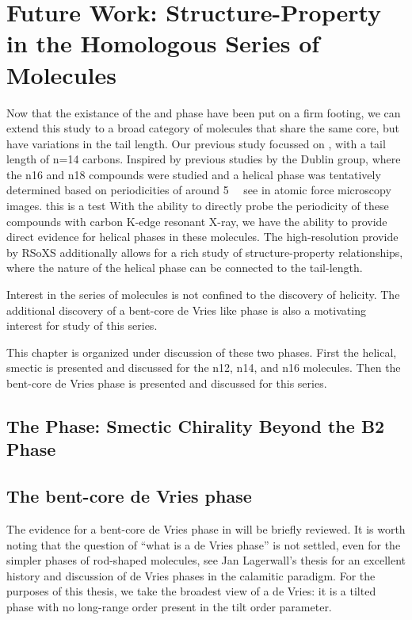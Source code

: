 \documentclass[aagreenthesis]{subfiles}
\begin{document}
\chapter{Future Work: Structure-Property in the \nfour{} Homologous Series of Molecules}

Now that the existance of the \smcpalpha{} and \smcapa{} phase have been put on
a firm footing, we can extend this study to a broad category of molecules that
share the same core, but have variations in the tail length. Our previous study
focussed on \nfour{}, with a tail length of n=14 carbons. Inspired by
previous studies by the Dublin
group\cite{SreenilayamSpontaneoushelixformation2016,SreenilayamDevelopmentferroelectricitysmectic2017,VijInvestigationheliconicalsmectic2019},
where the n16 and n18 compounds were studied and a helical phase was tentatively
determined based on periodicities of around \SI{5}{\nano\meters} see in atomic
force microscopy images.
this is a test
With the ability to directly probe the periodicity of these compounds with
carbon K-edge resonant X-ray, we have the ability to provide direct evidence for
helical phases in these molecules. The high-resolution provide by RSoXS
additionally allows for a rich study of structure-property relationships, where
the nature of the helical phase can be connected to the tail-length.

Interest in the \nfour{} series of molecules is not confined to the discovery of
helicity. The additional discovery of a bent-core de Vries like phase is also a
motivating interest for study of this series. 

This chapter is organized under discussion of these two phases. First the
helical, smectic \smcpalpha{} is presented and discussed for the n12, n14, and n16 molecules.
Then the bent-core de Vries phase is presented and discussed for this series.

\section{The \smcpalpha{} Phase: Smectic Chirality Beyond the B2 Phase}


\section{The bent-core de Vries phase}

The evidence for a bent-core de Vries phase in \nfour{} will be briefly
reviewed. It is worth noting that the question of ``what is a de Vries phase''
is not settled, even for the simpler phases of rod-shaped molecules, see Jan
Lagerwall's thesis\cite{jansThesis} for an excellent history and discussion of
de Vries phases in the calamitic paradigm. For the purposes of this thesis, we
take the broadest view of a de Vries: it is a tilted phase with no long-range
order present in the tilt order parameter.
\end{document}
